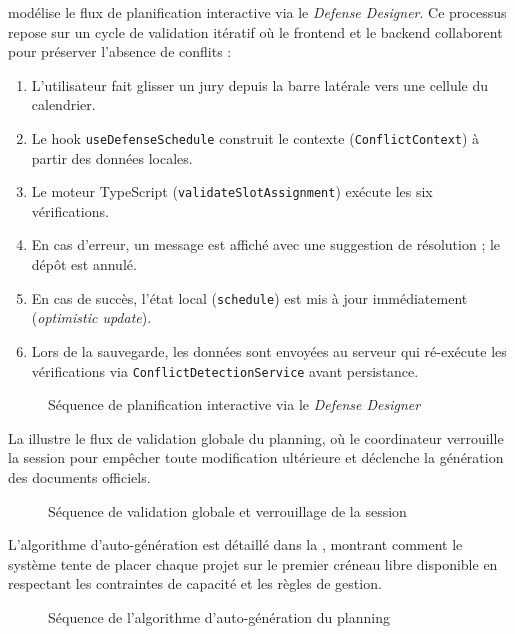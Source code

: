  modélise le flux de planification interactive via le \textit{Defense Designer}. Ce processus repose sur un cycle de validation itératif où le frontend et le backend collaborent pour préserver l'absence de conflits :

\begin{enumerate}
    \item L'utilisateur fait glisser un jury depuis la barre latérale vers une cellule du calendrier.
    \item Le hook \texttt{useDefenseSchedule} construit le contexte (\texttt{ConflictContext}) à partir des données locales.
    \item Le moteur TypeScript (\texttt{validateSlotAssignment}) exécute les six vérifications.
    \item En cas d'erreur, un message est affiché avec une suggestion de résolution ; le dépôt est annulé.
    \item En cas de succès, l'état local (\texttt{schedule}) est mis à jour immédiatement (\textit{optimistic update}).
    \item Lors de la sauvegarde, les données sont envoyées au serveur qui ré-exécute les vérifications via \texttt{ConflictDetectionService} avant persistance.
\end{enumerate}

\begin{figure}[H]
    \centering
    \caption{Séquence de planification interactive via le \textit{Defense Designer}}
    \label{fig:seq_planning}
\end{figure}
La  illustre le flux de validation globale du planning, où le coordinateur verrouille la session pour empêcher toute modification ultérieure et déclenche la génération des documents officiels.
\begin{figure}[H]
    \centering
    \caption{Séquence de validation globale et verrouillage de la session}
    \label{fig:seq_validate_planning}
\end{figure}
L'algorithme d'auto-génération est détaillé dans la , montrant comment le système tente de placer chaque projet sur le premier créneau libre disponible en respectant les contraintes de capacité et les règles de gestion.
\begin{figure}[H]
    \centering
    \caption{Séquence de l'algorithme d'auto-génération du planning}
    \label{fig:seq_auto_generation}
\end{figure}

